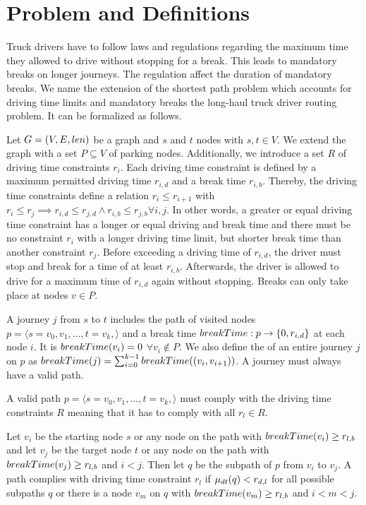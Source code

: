 \chapter{Problem and Definitions}\label{chapter:problem_definitions}
Truck drivers have to follow laws and regulations regarding the maximum time they allowed to drive without stopping for a break. This leads to mandatory breaks on longer journeys. The regulation affect the duration of mandatory breaks. We name the extension of the shortest path problem which accounts for driving time limits and mandatory breaks the long-haul truck driver routing problem. It can be formalized as follows.

Let $G=(V,E,len)$ be a graph and $s$ and $t$ nodes with $s,t \in V$. We extend the graph with a set $P \subseteq V$ of parking nodes. Additionally, we introduce a set $R$ of driving time constraints $r_i$. Each driving time constraint is defined by a maximum permitted driving time $r_{i,d}$ and a break time $r_{i,b}$. Thereby, the driving time constraints define a relation $r_i \le r_{i+1}$ with $r_i \le r_j \implies r_{i,d} \le r_{j,d} \land  r_{i,b} \le r_{j,b} \forall i,j$. In other words, a greater or equal driving time constraint has a longer or equal driving and break time and there must be no constraint $r_i$ with a longer driving time limit, but shorter break time than another constraint $r_j$. Before exceeding a driving time of $r_{i,d}$, the driver must stop and break for a time of at least $r_{i,b}$. Afterwards, the driver is allowed to drive for a maximum time of $r_{i,d}$ again without stopping. Breaks can only take place at nodes $v \in P$.

A journey $j$ from $s$ to $t$ includes the path of visited nodes $p = \langle s=v_0,v_1,...,t=v_k, \rangle$ and a break time $breakTime: p \rightarrow \{0,r_{i,d}\}$ at each node $i$. It is $breakTime(v_i) = 0$ $\forall v_i \notin P$. We also define the \breakTime of an entire journey $j$ on $p$ as $breakTime(j) = \sum_{i=0}^{k-1}{breakTime((v_i,v_{i+1}))}$. A journey must always have a valid path.

\begin{definition}
	A valid path $p = \langle s=v_0,v_1,...,t=v_k, \rangle$ must comply with the driving time constraints $R$ meaning that it has to comply with all $r_l \in R$.

	Let $v_i$ be the starting node $s$ or any node on the path with $breakTime(v_i) \ge r_{l,b}$ and let $v_j$ be the target node $t$ or any node on the path with $breakTime(v_j) \ge r_{l,b}$ and $i < j$. Then let $q$ be the subpath of $p$ from $v_i$ to $v_j$. A path complies with driving time constraint $r_l$ if $\mu_{dt}(q) < r_{d,l}$ for all possible subpaths $q$ or there is a node $v_m$ on $q$ with $breakTime(v_m) \ge r_{l,b}$ and $i < m < j$.
\end{definition}

